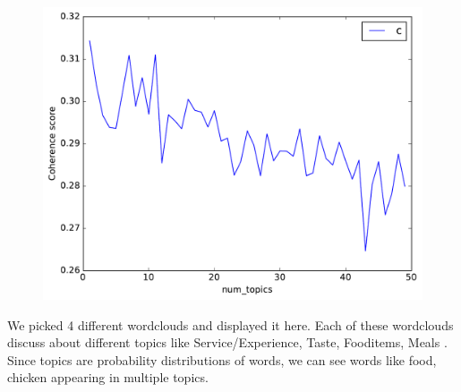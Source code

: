 \documentclass{neu_handout}
\begin{document}
\begin{figure}[h]
\centering
{
\includegraphics[width=0.3\linewidth]{negative_coherence-topics}
}
\end{figure}

We picked 4 different wordclouds and displayed it here. Each of these wordclouds discuss about different topics like Service/Experience, Taste, Fooditems, Meals . Since topics are probability distributions of words, we can see words like food, chicken appearing in multiple topics. 

\begin{figure}[h]
\centering
{}
\end{figure}

\begin{figure}[h]
\centering
{}
\end{figure}
\end{document}
